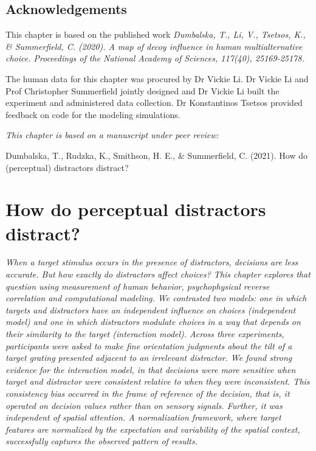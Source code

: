 \documentclass[a4paper, nobind]{templates/ociamthesis}
\begin{document}
\hypertarget{acknowledgements}{%
\section{Acknowledgements}\label{acknowledgements}}

This chapter is based on the published work \emph{Dumbalska, T., Li, V., Tsetsos, K., \& Summerfield, C. (2020). A map of decoy influence in human multialternative choice. Proceedings of the National Academy of Sciences, 117(40), 25169-25178.}

The human data for this chapter was procured by Dr Vickie Li. Dr Vickie Li and Prof Christopher Summerfield jointly designed and Dr Vickie Li built the experiment and administered data collection. Dr Konstantinos Tsetsos provided feedback on code for the modeling simulations.

\begin{savequote}
\emph{This chapter is based on a manuscript under peer review:}

Dumbalska, T., Rudzka, K., Smithson, H. E., \& Summerfield, C. (2021).
How do (perceptual) distractors distract?
\qauthor{}\end{savequote}

\hypertarget{distr}{%
\chapter{How do perceptual distractors distract?}\label{distr}}

\minitoc

\noindent 
\emph{When a target stimulus occurs in the presence of distractors, decisions are less accurate. But how exactly do distractors affect choices? This chapter explores that question using measurement of human behavior, psychophysical reverse correlation and computational modeling. We contrasted two models: one in which targets and distractors have an independent influence on choices (independent model) and one in which distractors modulate choices in a way that depends on their similarity to the target (interaction model). Across three experiments, participants were asked to make fine orientation judgments about the tilt of a target grating presented adjacent to an irrelevant distractor. We found strong evidence for the interaction model, in that decisions were more sensitive when target and distractor were consistent relative to when they were inconsistent. This consistency bias occurred in the frame of reference of the decision, that is, it operated on decision values rather than on sensory signals. Further, it was independent of spatial attention. A normalization framework, where target features are normalized by the expectation and variability of the spatial context, successfully captures the observed pattern of results.}
\end{document}
